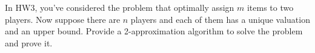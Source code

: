 
\problem{}

In HW3, you've considered the problem that optimally assign $m$ items to two players. Now suppose there are $n$ players and each of them has a unique valuation and an upper bound. Provide a 2-approximation algorithm to solve the problem and prove it.

